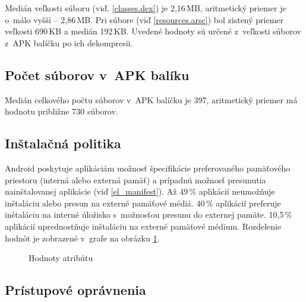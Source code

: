 Medián veľkosti súboru  (viď. \ref{classes.dex}) je 2,16\,MB, aritmetický priemer je o~málo vyšší -- 2,86\,MB. Pri súbore  (viď \ref{resources.arsc}) bol zistený priemer veľkosti 690\,KB a medián 192\,KB. Uvedené hodnoty sú určené z~veľkosti súborov z~APK balíčku po ich dekompresii.

\subsection{Počet súborov v~APK balíku}
Medián celkového počtu súborov v~APK balíčku je 397, aritmetický priemer má hodnotu približne 730 súborov.

\subsection{Inštalačná politika}
Android poskytuje aplikáciám možnosť špecifikácie preferovaného pamäťového priestoru (interná alebo externá pamäť) a prípadnú možnosť presunutia nainštalovanej aplikácie (viď \ref{el_manifest}). Až 49\,\% aplikácií neumožňuje inštaláciu alebo presun na externé pamäťové médiá.  40\,\% aplikácií preferuje inštaláciu na interné úložisko s~možnosťou presunu do externej pamäte. 10,5\,\% aplikácií uprednostňuje inštaláciu na externé pamäťové médium. Rozdelenie hodnôt je zobrazené v~grafe na obrázku \ref{installLocFig}.

\begin{figure}[htb]
\centering
{}
\caption{Hodnoty atribútu }
\label{installLocFig}
\end{figure}

\subsection{Prístupové oprávnenia}

